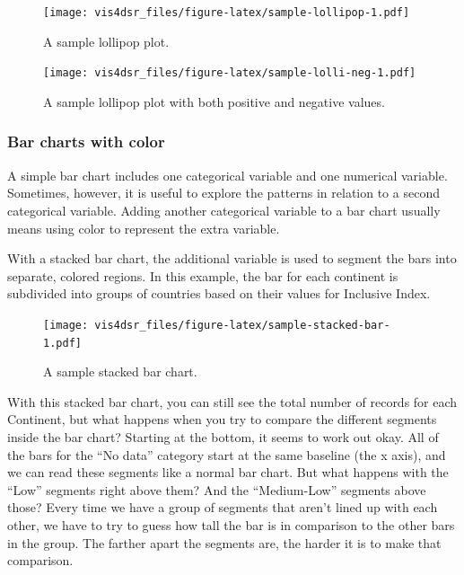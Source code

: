 \documentclass[
]{krantz}
\begin{document}
\begin{figure}
\centering
\texttt{[image: vis4dsr\_files/figure-latex/sample-lollipop-1.pdf]}
\caption{\label{fig:sample-lollipop}A sample lollipop plot.}
\end{figure}

\begin{figure}
\centering
\texttt{[image: vis4dsr\_files/figure-latex/sample-lolli-neg-1.pdf]}
\caption{\label{fig:sample-lolli-neg}A sample lollipop plot with both positive and negative values.}
\end{figure}

\hypertarget{bar-charts-with-color}{%
\subsubsection{Bar charts with color}\label{bar-charts-with-color}}

A simple bar chart includes one categorical variable and one numerical variable.
Sometimes, however, it is useful to explore the patterns in relation to a second
categorical variable. Adding another categorical variable to a bar chart usually
means using color to represent the extra variable.

With a stacked bar chart, the additional variable is used to segment the bars into
separate, colored regions. In this example, the bar for each continent is subdivided
into groups of countries based on their values for Inclusive Index.

\begin{figure}
\centering
\texttt{[image: vis4dsr\_files/figure-latex/sample-stacked-bar-1.pdf]}
\caption{\label{fig:sample-stacked-bar}A sample stacked bar chart.}
\end{figure}

With this stacked bar chart, you can still see the total number of records for each Continent,
but what happens when you try to compare the different segments inside the
bar chart? Starting at the bottom, it seems to work out okay. All of the bars
for the ``No data'' category start at the same baseline (the x axis), and we can
read these segments like a normal bar chart. But what happens with the ``Low'' segments
right above them? And the ``Medium-Low'' segments above those? Every time we have
a group of segments that aren't lined up with each other, we have to try to guess
how tall the bar is in comparison to the other bars in the group. The farther
apart the segments are, the harder it is to make that comparison.
\end{document}
